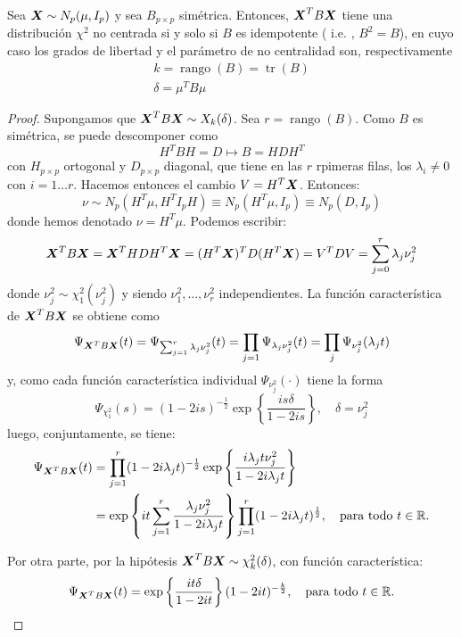 \begin{nth}
  Sea $\boldsymbol{X} \sim N_p(\mu, I_p)$ y sea $B_{p\times p}$ simétrica. Entonces, $\boldsymbol{X}^T B \boldsymbol{X}$ tiene una distribución $\chi^2$ no centrada si y solo si $B$ es idempotente ( i.e. , $B^2 = B$), en cuyo caso los grados de libertad y el parámetro de no centralidad son, respectivamente
  \begin{align}
    k = \operatorname{rango}(B) = \operatorname{tr}(B)\\
    \delta = \mu^T B \mu
  \end{align}
\end{nth}
\begin{proof}
  \boxed{\implies} Supongamos que $\boldsymbol{X}^T B \boldsymbol{X} \sim X_k(\delta)$. Sea $r=\operatorname{rango}(B)$. Como $B$ es simétrica, se puede descomponer como
  \[
  H^T B H = D \mapsto B = HDH^T
  \]
  con $H_{p\times p}$ ortogonal y $D_{p\times p}$ diagonal, que tiene en las $r$ rpimeras filas, los $\lambda_i \ne 0$ con $i = 1\dots r$. Hacemos entonces el cambio $V = H^T \boldsymbol{X}$. Entonces:
  \[
  \nu \sim N_p(H^T \mu,H^TI_p H) \equiv N_p(H^T \mu,I_p) \equiv N_p(D,I_p)
  \]
  donde hemos denotado $\nu = H^T\mu$. Podemos escribir:
  \[
  \boldsymbol{X}^T B \boldsymbol{X} = \boldsymbol{X}^T H D H^T \boldsymbol{X} = (H^T \boldsymbol{X})^T D (H^T \boldsymbol{X}) = V^T D V =  \sum_{j = 0}^r \lambda_j \nu_j^2
  \]
  donde $\nu_j^2\sim \chi_1^2(\nu_j^2)$ y siendo $\nu_1^2,\dots,\nu_r^2$ independientes. La función característica de $\boldsymbol{X}^T B \boldsymbol{X}$ se obtiene como
  \[
\Psi_{\boldsymbol{X}^T B \boldsymbol{X}}(t) = \Psi_{\sum_{j=1}^r \lambda_j \nu_j^2}(t) = \prod_{j=1}\Psi_{\lambda_j \nu_j^2}(t) = \prod_j \Psi_{\nu_j^2}(\lambda_j t)
\]
y, como cada función característica individual $\Psi_{\nu_j^2}(\cdot)$ tiene la forma
\[
\Psi_{\chi^2_1}(s) = (1-2is)^{-\frac{1}{2}} \exp \left\{ \frac{is\delta}{1-2is}\right\}, \quad \delta = \nu_j^2
\]
luego, conjuntamente, se tiene: \begin{align*}
  \Psi_{\boldsymbol{X}^T B \boldsymbol{X}}(t) &= \prod_{j = 1}^r (1-2i \lambda_jt)^{-\frac{1}{2}} \exp\left\{ \frac{i\lambda_j t \nu^2_j}{1-2i\lambda_jt}\right\}\\
    &= \exp\left\{it \sum_{j = 1}^r \frac{\lambda_j \nu_j^2}{1-2i\lambda_j t}\right\}\prod_{j=1}^r(1-2i\lambda_j t)^{\frac{1}{2}}, \quad \text{para todo } t \in \mathbb R.
\end{align*}

Por otra parte, por la hipótesis $\boldsymbol{X}^T B \boldsymbol{X} \sim \chi_k^2(\delta)$, con función característica:
\[
\Psi_{\boldsymbol{X} ^T B \boldsymbol{X}}(t) =  \exp \left\{ \frac{it\delta}{1-2it}\right\}(1-2it)^{-\frac{k}{2}}, \quad \text{para todo } t \in \mathbb R.
\]


\end{proof}
